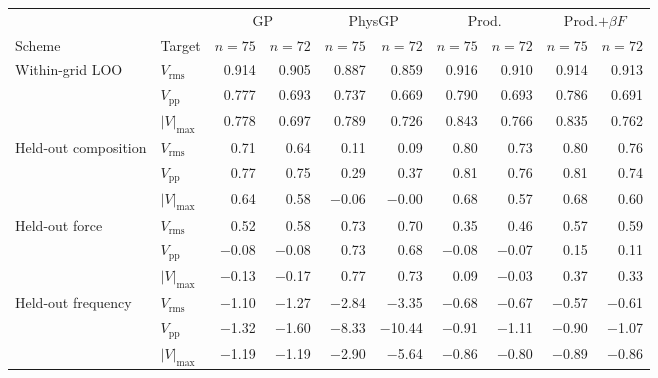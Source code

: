\begin{tabular}{llrrrrrrrr}
\toprule
 & & \multicolumn{2}{c}{GP} & \multicolumn{2}{c}{PhysGP} & \multicolumn{2}{c}{Prod.} & \multicolumn{2}{c}{Prod.$+\beta F$} \\
\cmidrule(lr){3-4} \cmidrule(lr){5-6} \cmidrule(lr){7-8} \cmidrule(lr){9-10}
Scheme & Target & $n=75$ & $n=72$ & $n=75$ & $n=72$ & $n=75$ & $n=72$ & $n=75$ & $n=72$ \\
\midrule
Within-grid LOO & $V_\mathrm{rms}$ & 0.914 & 0.905 & 0.887 & 0.859 & 0.916 & 0.910 & 0.914 & 0.913 \\
 & $V_\mathrm{pp}$ & 0.777 & 0.693 & 0.737 & 0.669 & 0.790 & 0.693 & 0.786 & 0.691 \\
 & $|V|_\mathrm{max}$ & 0.778 & 0.697 & 0.789 & 0.726 & 0.843 & 0.766 & 0.835 & 0.762 \\
\midrule
Held-out composition & $V_\mathrm{rms}$ & 0.71 & 0.64 & 0.11 & 0.09 & 0.80 & 0.73 & 0.80 & 0.76 \\
 & $V_\mathrm{pp}$ & 0.77 & 0.75 & 0.29 & 0.37 & 0.81 & 0.76 & 0.81 & 0.74 \\
 & $|V|_\mathrm{max}$ & 0.64 & 0.58 & $-$0.06 & $-$0.00 & 0.68 & 0.57 & 0.68 & 0.60 \\
\midrule
Held-out force & $V_\mathrm{rms}$ & 0.52 & 0.58 & 0.73 & 0.70 & 0.35 & 0.46 & 0.57 & 0.59 \\
 & $V_\mathrm{pp}$ & $-$0.08 & $-$0.08 & 0.73 & 0.68 & $-$0.08 & $-$0.07 & 0.15 & 0.11 \\
 & $|V|_\mathrm{max}$ & $-$0.13 & $-$0.17 & 0.77 & 0.73 & 0.09 & $-$0.03 & 0.37 & 0.33 \\
\midrule
Held-out frequency & $V_\mathrm{rms}$ & $-$1.10 & $-$1.27 & $-$2.84 & $-$3.35 & $-$0.68 & $-$0.67 & $-$0.57 & $-$0.61 \\
 & $V_\mathrm{pp}$ & $-$1.32 & $-$1.60 & $-$8.33 & $-$10.44 & $-$0.91 & $-$1.11 & $-$0.90 & $-$1.07 \\
 & $|V|_\mathrm{max}$ & $-$1.19 & $-$1.19 & $-$2.90 & $-$5.64 & $-$0.86 & $-$0.80 & $-$0.89 & $-$0.86 \\
\bottomrule
\end{tabular}
